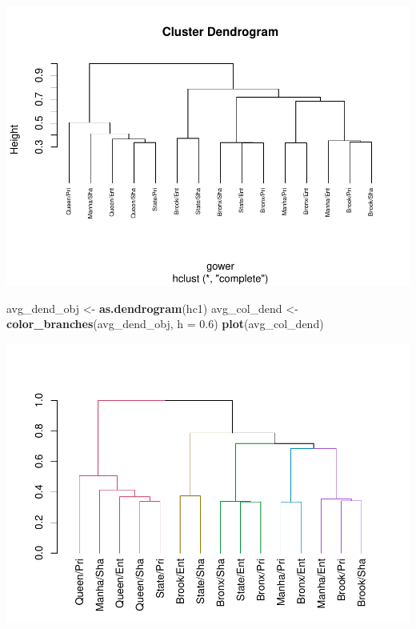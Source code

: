 \documentclass[
]{article}
\newenvironment{Shaded}{\begin{snugshade}}{\end{snugshade}}
\newcommand{\DataTypeTok}[1]{\textcolor[rgb]{0.13,0.29,0.53}{#1}}
\newcommand{\FloatTok}[1]{\textcolor[rgb]{0.00,0.00,0.81}{#1}}
\newcommand{\KeywordTok}[1]{\textcolor[rgb]{0.13,0.29,0.53}{\textbf{#1}}}
\newcommand{\NormalTok}[1]{#1}
\newcommand{\OperatorTok}[1]{\textcolor[rgb]{0.81,0.36,0.00}{\textbf{#1}}}
\newcommand{\StringTok}[1]{\textcolor[rgb]{0.31,0.60,0.02}{#1}}
\begin{document}
\includegraphics{project-code_files/figure-latex/unnamed-chunk-26-1.pdf}

\begin{Shaded}
\begin{Highlighting}[]
\NormalTok{avg_dend_obj <-}\StringTok{ }\KeywordTok{as.dendrogram}\NormalTok{(hc1)}
\NormalTok{avg_col_dend <-}\StringTok{ }\KeywordTok{color_branches}\NormalTok{(avg_dend_obj, }\DataTypeTok{h =} \FloatTok{0.6}\NormalTok{)}
\KeywordTok{plot}\NormalTok{(avg_col_dend)}
\end{Highlighting}
\end{Shaded}

\includegraphics{project-code_files/figure-latex/unnamed-chunk-27-1.pdf}

\begin{Shaded}
\end{Shaded}
\end{document}

